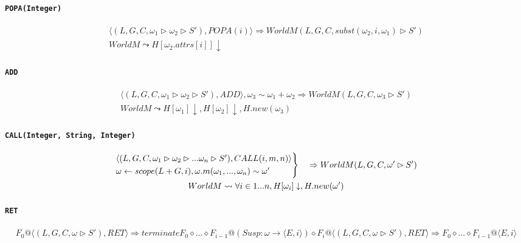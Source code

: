 \documentclass[]{article}
\numberwithin{equation}{section}
\numberwithin{figure}{section}
\numberwithin{table}{section}
\begin{document}
\paragraph{\texttt{POPA(Integer)}}\label{popainteger}

\begin{gather*}
  \langle (L, G, C, \omega_1 \rhd \omega_2 \rhd S'), POPA(i)\rangle \Rightarrow WorldM (L, G, C, subst(\omega_2, i, \omega_1) \rhd S' )\\
  WorldM \leadsto H[\omega_2.attrs[i]] \downarrow
\end{gather*}

\paragraph{\texttt{ADD}}\label{add}

\begin{gather*}
  \langle (L, G, C, \omega_1 \rhd \omega_2 \rhd S'), ADD\rangle, \omega_3 \sim \omega_1 + \omega_2 \Rightarrow WorldM (L, G, C, \omega_3 \rhd S')\\
  WorldM \leadsto H[\omega_1] \downarrow, H[\omega_2] \downarrow, H.new(\omega_3)
\end{gather*}

\paragraph{\texttt{CALL(Integer, String, Integer)}}\label{callinteger-string-integer}

\begin{gather*}
  \begin{rcases}
    \langle (L, G, C, \omega_1 \rhd \omega_2 \rhd ... \omega_n \rhd S'), CALL(i, m, n)\rangle\\
    \omega \leftarrow scope(L + G, i), \omega.m(\omega_1, ..., \omega_n) \sim \omega'
  \end{rcases}
  \quad
    \Rightarrow WorldM (L, G, C, \omega' \rhd S' )\\
  WorldM \leadsto \forall i \in 1...n, H[\omega_i] \downarrow, H.new(\omega')
\end{gather*}

\paragraph{\texttt{RET}}\label{ret}

\begin{gather*}
  F_0@\langle (L, G, C, \omega \rhd S'), RET\rangle \Rightarrow terminate
  F_0 \diamond ... \diamond F_{i - 1}@(Susp: \omega \rightarrow \langle E, i \rangle)\diamond F_i@\langle (L, G, C, \omega \rhd S'), RET\rangle \Rightarrow F_0 \diamond ... \diamond F_{i-1}@ \langle E, i \rangle
\end{gather*}
\end{document}
